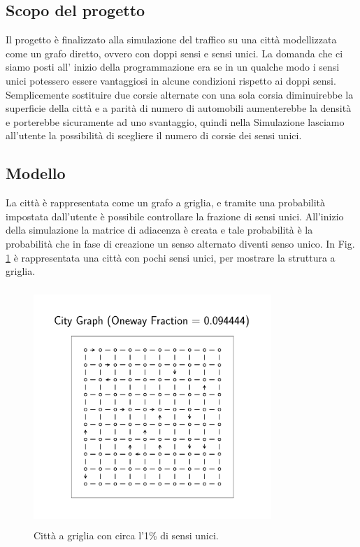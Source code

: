 \documentclass[main.tex]{subfiles}
\begin{document}
\subsection{Scopo del progetto}

Il progetto è finalizzato alla simulazione del traffico su una città modellizzata come un grafo diretto, ovvero con doppi sensi e sensi unici.
La domanda che ci siamo posti all' inizio della programmazione era se in un qualche modo i sensi unici potessero essere vantaggiosi in alcune condizioni
rispetto ai doppi sensi.
Semplicemente sostituire due corsie alternate con una sola corsia diminuirebbe la superficie della città
e a parità di numero di automobili aumenterebbe la densità e porterebbe sicuramente ad uno svantaggio, quindi nella Simulazione
lasciamo all'utente la possibilità di scegliere il numero di corsie dei sensi unici.

\subsection{Modello}

La città è rappresentata come un grafo a griglia, e tramite una probabilità impostata dall'utente è possibile controllare la frazione di sensi unici.
All'inizio della simulazione la matrice di adiacenza è creata e tale probabilità è la probabilità che in fase di creazione un senso alternato diventi senso unico.
In Fig. \ref{fig:1} è rappresentata una città con pochi sensi unici, per mostrare la struttura a griglia.

\begin{figure}[H]
    \centering
    \includegraphics[width=9cm, height=9cm]{city.png}
    \caption{Città a griglia con circa l'1\% di sensi unici.}
    \label{fig:1}
\end{figure}
\end{document}

